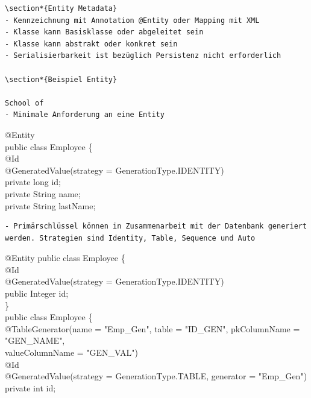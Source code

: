 \documentclass[10pt]{article}
\begin{document}
\begin{verbatim}
\section*{Entity Metadata}
- Kennzeichnung mit Annotation @Entity oder Mapping mit XML
- Klasse kann Basisklasse oder abgeleitet sein
- Klasse kann abstrakt oder konkret sein
- Serialisierbarkeit ist bezüglich Persistenz nicht erforderlich

\section*{Beispiel Entity}

School of
- Minimale Anforderung an eine Entity
\end{verbatim}

@Entity\\
public class Employee \{\\
@Id\\
@GeneratedValue(strategy = GenerationType.IDENTITY)\\
private long id;\\
private String name;\\
private String lastName;

\begin{verbatim}
- Primärschlüssel können in Zusammenarbeit mit der Datenbank generiert werden. Strategien sind Identity, Table, Sequence und Auto
\end{verbatim}

@Entity public class Employee \{\\
@Id\\
@GeneratedValue(strategy = GenerationType.IDENTITY)\\
public Integer id;\\
\}\\
public class Employee \{\\
@TableGenerator(name = "Emp\_Gen", table = "ID\_GEN", pkColumnName = "GEN\_NAME",\\
valueColumnName = "GEN\_VAL")\\
@Id\\
@GeneratedValue(strategy = GenerationType.TABLE, generator = "Emp\_Gen")\\
private int id;
\end{document}
